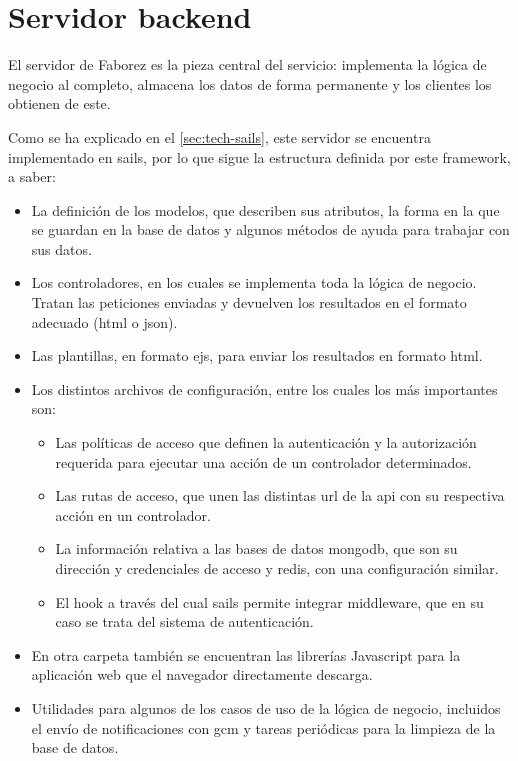 \documentclass[main]{subfiles}
\begin{document}
\chapter[Servidor backend]{Servidor \gls{backend}}

El servidor de Faborez es la pieza central del servicio: implementa la lógica de negocio al completo, almacena los datos de forma permanente y los clientes los obtienen de este.

Como se ha explicado en el \cref{sec:tech-sails}, este servidor se encuentra implementado en \gls{sails}, por lo que sigue la estructura definida por este \gls{framework}, a saber:

\begin{itemize}
  \item La definición de los modelos, que describen sus atributos, la forma en la que se guardan en la base de datos y algunos métodos de ayuda para trabajar con sus datos.
  \item Los controladores, en los cuales se implementa toda la lógica de negocio. Tratan las peticiones enviadas y devuelven los resultados en el formato adecuado (\gls{html} o \gls{json}).
  \item Las plantillas, en formato \gls{ejs}, para enviar los resultados en formato \gls{html}.
  \item Los distintos archivos de configuración, entre los cuales los más importantes son:
  \begin{itemize}
    \item Las políticas de acceso que definen la autenticación y la autorización requerida para ejecutar una acción de un controlador determinados.
    \item Las rutas de acceso, que unen las distintas \gls{url} de la \gls{api} con su respectiva acción en un controlador.
    \item La información relativa a las bases de datos \gls{mongodb}, que son su dirección y credenciales de acceso y \gls{redis}, con una configuración similar.
    \item El \gls{hook} a través del cual \gls{sails} permite integrar \gls{middleware}, que en su caso se trata del sistema de autenticación.
  \end{itemize}
  \item En otra carpeta también se encuentran las librerías Javascript para la aplicación web que el navegador directamente descarga.
  \item Utilidades para algunos de los casos de uso de la lógica de negocio, incluidos el envío de notificaciones con \gls{gcm} y tareas periódicas para la limpieza de la base de datos.
\end{itemize}
\end{document}
